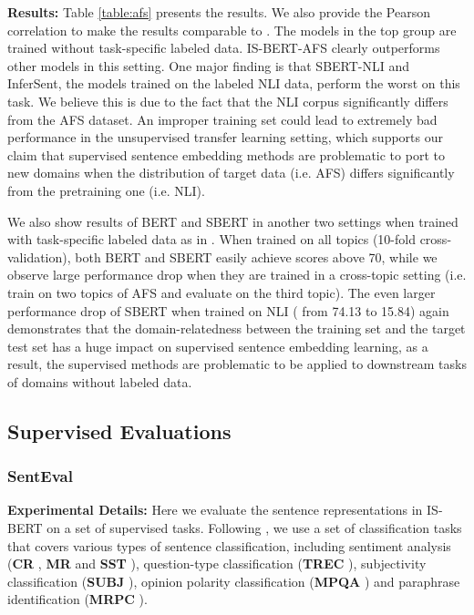 \documentclass[11pt,a4paper]{article}
\begin{document}
\noindent\textbf{Results: } Table \ref{table:afs} presents the results. We also provide the Pearson correlation  to make the results comparable to \cite{reimers2019}. The models in the top group are trained without task-specific labeled data. IS-BERT-AFS clearly outperforms other models in this setting. One major finding is that SBERT-NLI and InferSent, the models trained on the labeled NLI data, perform the worst on this task. We believe this is due to the fact that the NLI corpus significantly differs from the AFS dataset. An improper training set could lead to extremely bad performance in the unsupervised transfer learning setting,  which supports our claim that supervised sentence embedding methods are problematic to port to new domains when the distribution of target data (i.e. AFS) differs significantly from the pretraining one (i.e. NLI). 

We also show results of BERT and SBERT in another two settings when trained with task-specific labeled data as in \cite{reimers2019}. When trained on all topics (10-fold cross-validation), both BERT and SBERT easily achieve scores above 70, while we observe large performance drop when they are trained in a cross-topic setting (i.e. train on two topics of AFS and evaluate on the third topic). The even larger performance drop of SBERT when trained on NLI ( from 74.13 to 15.84) again demonstrates that the domain-relatedness between the training set and the target test set has a huge impact on supervised sentence embedding learning, as a result, the supervised methods are problematic to be applied to downstream tasks of domains without labeled data.


\subsection{Supervised Evaluations}
\subsubsection{SentEval}



\textbf{Experimental Details: } Here we evaluate the sentence representations in IS-BERT on a set of supervised tasks. 
Following \citet{reimers2019}, we use a set of classification tasks that covers various types of sentence classification, including sentiment analysis (\textbf{CR} \cite{Hu2004}, \textbf{MR} \cite{pang2005} and \textbf{SST} \cite{socher2013}), question-type classification (\textbf{TREC} \cite{li2002}), subjectivity classification (\textbf{SUBJ} \cite{pang2004}), opinion polarity classification (\textbf{MPQA} \cite{Wiebe2005}) and paraphrase identification (\textbf{MRPC} \cite{dolan2004}). 
\end{document}
